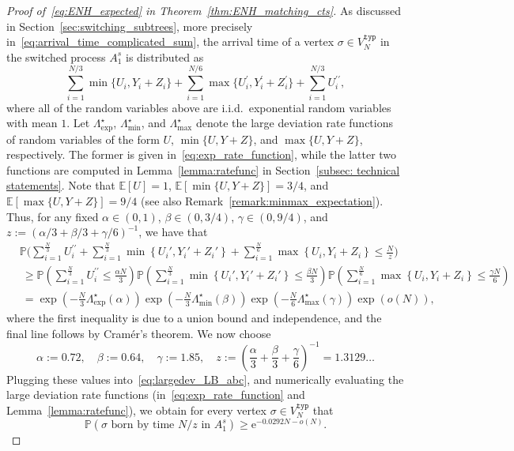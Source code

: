 \documentclass[11pt]{article}
\numberwithin{equation}{section}
\newcommand{\p}{\mathbb{P}} %
\newcommand{\E}{\mathbb{E}} %
\newcommand{\e}{\mathrm e}
\theoremstyle{definition}
\begin{document}
\begin{proof}[Proof of~\eqref{eq:ENH_expected} in Theorem~\ref{thm:ENH_matching_cts}]
As discussed in Section~\ref{sec:switching_subtrees}, more precisely in~\eqref{eq:arrival_time_complicated_sum}, the arrival time of a vertex $\sigma \in V_N^{\mathtt{typ}}$ in the switched process $A_{1}^{s}$ is distributed as
\begin{equation*}
    \sum_{i=1}^{N/3} \min \{ U_i,Y_i+Z_i \} 
    + \sum_{i=1}^{N/6} \max \{ U_i^\prime,Y_i^\prime+Z_i^\prime \}
    + \sum_{i=1}^{N/3} U_i^{\prime \prime},
\end{equation*}
where all of the random variables above are i.i.d.\ exponential random variables with mean $1$. 
Let $\Lambda_{\exp}^{\star}$, $\Lambda_{\min}^{\star}$, and $\Lambda_{\max}^{\star}$ denote the large deviation rate functions of random variables of the form $U$, $\min\{U,Y+Z\}$, and $\max\{U,Y+Z\}$, respectively. 
The former is given in~\eqref{eq:exp_rate_function}, 
while the latter two functions are computed in Lemma~\ref{lemma:ratefunc} in Section~\ref{subsec: technical statements}. 
Note that $\E[U] = 1$, 
$\E[ \min\{U,Y+Z\} ] = 3/4$, and 
$\E[ \max\{U,Y+Z\} ] = 9/4$ (see also Remark~\ref{remark:minmax_expectation}). 
Thus, for any fixed 
$\alpha\in(0,1)$, 
$\beta\in(0,3/4)$, 
$\gamma\in(0,9/4)$, and $z := (\alpha/3+\beta/3+\gamma/6)^{-1}$, 
we have that 
\begin{align}
    &\p \Bigg(\sum_{i=1}^\frac{N}{3} U_i^{\prime \prime}  +
    \sum_{i=1}^\frac{N}{3} \min \left\{ U_i', Y_i' + Z_i' \right\} + 
    \sum_{i=1}^\frac{N}{6} \max \left\{ U_i, Y_i + Z_i \right\} \leq \frac{N}{z} \Bigg)\\
    &\ \geq{}  \p\! \left( \sum_{i=1}^\frac{N}{3} U_i^{\prime \prime} \leq \frac{\alpha N}{3} \right)
    \p\! \left( 
    \sum_{i=1}^\frac{N}{3} \min \left\{ U_i', Y_i' + Z_i' \right\} \leq \frac{\beta N}{3} \right)
     \p\!\left(  
    \sum_{i=1}^\frac{N}{6} \max \left\{ U_i, Y_i + Z_i \right\} \leq \frac{\gamma N}{6} \right) \ \ \label{eq:largedev}
    \\
    &\ = \exp\left( - \frac{N}{3} \Lambda_{\exp}^{\star} \left(\alpha\right) \right)
    \exp\left( - \frac{N}{3} \Lambda_{\min}^{\star} \left(\beta\right) \right)\exp\left( - \frac{N}{6} \Lambda_{\max}^{\star} \left(\gamma\right) \right)
     \exp\left( o(N)\right),\label{eq:largedev_LB_abc}
\end{align}
where the first inequality is due to a union bound and independence, 
and the final line follows 
by Cram\'er's theorem. 
We now choose
\begin{equation}\label{eq:constants}
    \alpha := 0.72,
    \quad  \beta := 0.64,
    \quad  \gamma := 1.85,
    \quad z := \left( \frac{\alpha}{3} + \frac{\beta}{3} + \frac{\gamma}{6} \right)^{-1} = 1.3129\ldots 
\end{equation}
Plugging these values into~\eqref{eq:largedev_LB_abc}, 
and numerically evaluating the large deviation rate functions (in~\eqref{eq:exp_rate_function} and Lemma~\ref{lemma:ratefunc}), 
we obtain for every vertex $\sigma\in V_N^{\mathtt{typ}}$ that 
\begin{equation*}
    \p \left( \sigma \text{ born by time } N/z \text{ in } A_{1}^{s} \right) 
    \geq \e^{ - 0.0292  N - o(N)}.
\end{equation*}



\end{proof}
\end{document}
